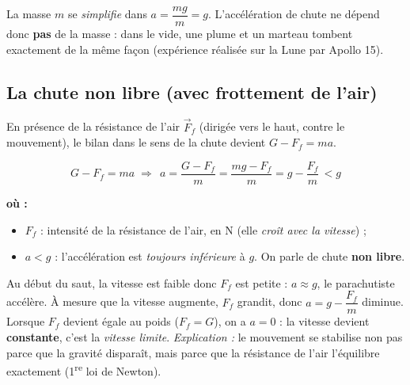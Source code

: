 \documentclass[11pt,a4paper]{article}
\newenvironment{ou}{%
  \par\smallskip\noindent\textbf{où :}\nopagebreak
  \begin{itemize}[leftmargin=1.8em,topsep=2pt,itemsep=1.5pt,parsep=0pt]}%
  {\end{itemize}}
\newcommand{\vv}[1]{\vec{#1}}
\begin{document}
\begin{remarque}
La masse $m$ se \emph{simplifie} dans $a=\dfrac{mg}{m}=g$. L'accélération de chute ne dépend donc
\textbf{pas} de la masse : dans le vide, une plume et un marteau tombent exactement de la même
façon (expérience réalisée sur la Lune par Apollo 15).
\end{remarque}

\subsection{La chute non libre (avec frottement de l'air)}

En présence de la résistance de l'air $\vv F_f$ (dirigée vers le haut, contre le mouvement), le
bilan dans le sens de la chute devient $G-F_f=ma$.

\begin{center}
\end{center}

\begin{formule}
\[ G-F_f=ma \;\Longrightarrow\;
   \boxed{\,a=\frac{G-F_f}{m}=\frac{mg-F_f}{m}=g-\frac{F_f}{m}\,}<g \]
\begin{ou}
  \item $F_f$ : intensité de la résistance de l'air, en \si{\newton} (elle \emph{croît avec la vitesse}) ;
  \item $a<g$ : l'accélération est \emph{toujours inférieure} à $g$. On parle de chute \textbf{non libre}.
\end{ou}
\end{formule}

\begin{exemple}
Au début du saut, la vitesse est faible donc $F_f$ est petite : $a\approx g$, le parachutiste
accélère. À mesure que la vitesse augmente, $F_f$ grandit, donc $a=g-\dfrac{F_f}{m}$ diminue.
Lorsque $F_f$ devient égale au poids ($F_f=G$), on a $a=0$ : la vitesse devient \textbf{constante},
c'est la \emph{vitesse limite}. \emph{Explication :} le mouvement se stabilise non pas parce que la
gravité disparaît, mais parce que la résistance de l'air l'équilibre exactement (1\textsuperscript{re} loi de Newton).
\end{exemple}
\end{document}
